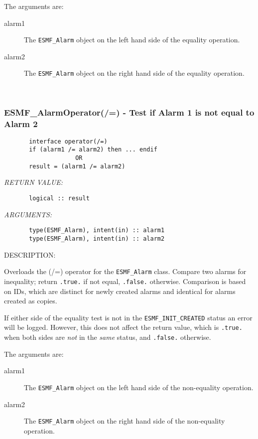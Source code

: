        The arguments are:
       \begin{description}
       \item[alarm1]
            The {\tt ESMF\_Alarm} object on the left hand side of the equality
            operation.
       \item[alarm2]
            The {\tt ESMF\_Alarm} object on the right hand side of the equality
            operation.
       \end{description}
   
 
\mbox{}\hrulefill\ 
 
\subsubsection [ESMF\_AlarmOperator(/=)] {ESMF\_AlarmOperator(/=) - Test if Alarm 1 is not equal to Alarm 2}


  
\begin{verbatim}       interface operator(/=)
       if (alarm1 /= alarm2) then ... endif
                    OR
       result = (alarm1 /= alarm2)\end{verbatim}{\em RETURN VALUE:}
\begin{verbatim}       logical :: result\end{verbatim}{\em ARGUMENTS:}
\begin{verbatim}       type(ESMF_Alarm), intent(in) :: alarm1
       type(ESMF_Alarm), intent(in) :: alarm2\end{verbatim}
{\sf DESCRIPTION:\\ }


       Overloads the (/=) operator for the {\tt ESMF\_Alarm} class.
       Compare two alarms for inequality; return {\tt .true.} if not equal,
       {\tt .false.} otherwise. Comparison is based on IDs, which are distinct
       for newly created alarms and identical for alarms created as copies.
  
       If either side of the equality test is not in the
       {\tt ESMF\_INIT\_CREATED} status an error will be logged. However, this
       does not affect the return value, which is {\tt .true.} when both sides
       are {\em not} in the {\em same} status, and {\tt .false.} otherwise.
  
       The arguments are:
       \begin{description}
       \item[alarm1]
            The {\tt ESMF\_Alarm} object on the left hand side of the
            non-equality operation.
       \item[alarm2]
            The {\tt ESMF\_Alarm} object on the right hand side of the
            non-equality operation.
       \end{description}
   

